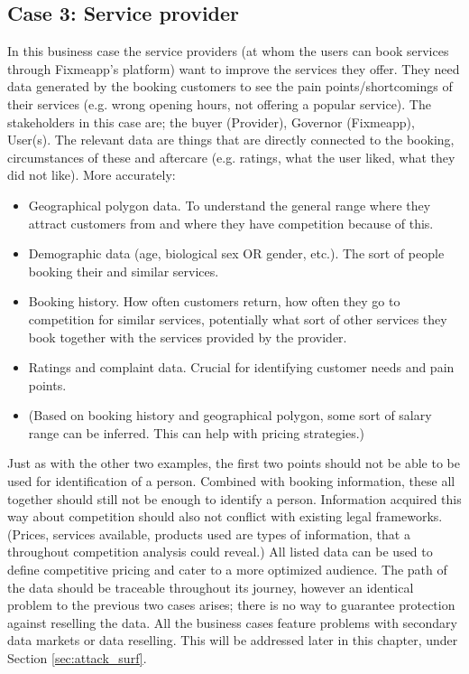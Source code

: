 \documentclass[a4paper,11pt]{report} %
\theoremstyle{change}
\theoremstyle{theoremstyle}
\begin{document}
\subsection{Case 3: Service provider}
In this business case the service providers (at whom the users can book services through Fixmeapp's platform) want to improve the services they offer. They need data generated by the booking customers to see the pain points/shortcomings of their services (e.g. wrong opening hours, not offering a popular service).
The stakeholders in this case are; the buyer (Provider), Governor (Fixmeapp), User(s). The relevant data are things that are directly connected to the booking, circumstances of these and aftercare (e.g. ratings, what the user liked, what they did not like). More accurately:
\begin{itemize}
    \item Geographical polygon data. To understand the general range where they attract customers from and where they have competition because of this.
    \item Demographic data (age, biological sex OR gender, etc.). The sort of people booking their and similar services.
    \item Booking history. How often customers return, how often they go to competition for similar services, potentially what sort of other services they book together with the services provided by the provider.
    \item Ratings and complaint data. Crucial for identifying customer needs and pain points.
    \item (Based on booking history and geographical polygon, some sort of salary range can be inferred. This can help with pricing strategies.)
\end{itemize}
Just as with the other two examples, the first two points should not be able to be used for identification of a person. Combined with booking information, these all together should still not be enough to identify a person. Information acquired this way about competition should also not conflict with existing legal frameworks. (Prices, services available, products used are types of information, that a throughout competition analysis could reveal.) All listed data can be used to define competitive pricing and cater to a more optimized audience. The path of the data should be traceable throughout its journey, however an identical problem to the previous two cases arises; there is no way to guarantee protection against reselling the data.
All the business cases feature problems with secondary data markets or data reselling. This will be addressed later in this chapter, under Section \ref{sec:attack_surf}.
\end{document}
